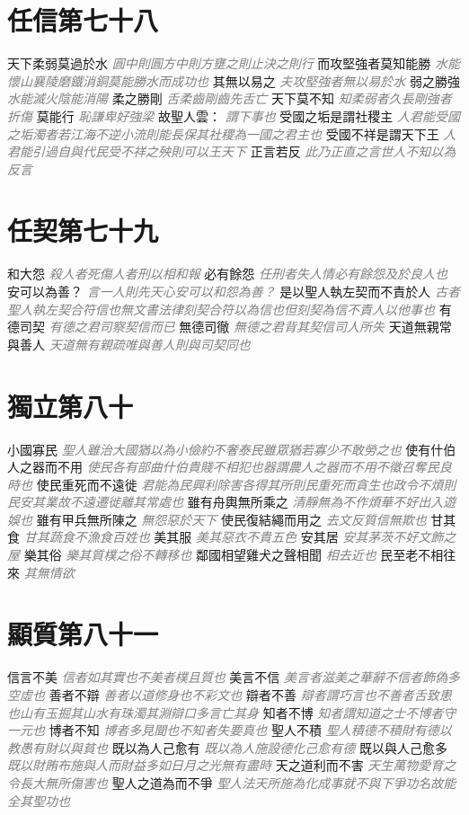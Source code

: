 \documentclass[a4paper,zihao=-4,oneside,landscape,UTF8]{ctexart}
\newcommand{\zhushi}[1]{\scriptsize{\textit{\textcolor{gray}{#1}}}\normalsize}
\begin{document}
\section{任信第七十八}

天下柔弱莫過於水
\zhushi{圓中則圓方中則方壅之則止決之則行}
而攻堅強者莫知能勝
\zhushi{水能懷山襄陵磨鐵消銅莫能勝水而成功也}
其無以易之
\zhushi{夫攻堅強者無以易於水}
弱之勝強
\zhushi{水能滅火陰能消陽}
柔之勝剛
\zhushi{舌柔齒剛齒先舌亡}
天下莫不知
\zhushi{知柔弱者久長剛強者折傷}
莫能行
\zhushi{恥謙卑好強梁}
故聖人雲：
\zhushi{謂下事也}
受國之垢是謂社稷主
\zhushi{人君能受國之垢濁者若江海不逆小流則能長保其社稷為一國之君主也}
受國不祥是謂天下王
\zhushi{人君能引過自與代民受不祥之殃則可以王天下}
正言若反
\zhushi{此乃正直之言世人不知以為反言}


\section{任契第七十九}

和大怨
\zhushi{殺人者死傷人者刑以相和報}
必有餘怨
\zhushi{任刑者失人情必有餘怨及於良人也}
安可以為善？
\zhushi{言一人則先天心安可以和怨為善？}
是以聖人執左契而不責於人
\zhushi{古者聖人執左契合符信也無文書法律刻契合符以為信也但刻契為信不責人以他事也}
有德司契
\zhushi{有德之君司察契信而已}
無德司徹
\zhushi{無德之君背其契信司人所失}
天道無親常與善人
\zhushi{天道無有親疏唯與善人則與司契同也}


\section{獨立第八十}

小國寡民
\zhushi{聖人雖治大國猶以為小儉約不奢泰民雖眾猶若寡少不敢勞之也}
使有什伯人之器而不用
\zhushi{使民各有部曲什伯貴賤不相犯也器謂農人之器而不用不徵召奪民良時也}
使民重死而不遠徙
\zhushi{君能為民興利除害各得其所則民重死而貪生也政令不煩則民安其業故不遠遷徙離其常處也}
雖有舟輿無所乘之
\zhushi{清靜無為不作煩華不好出入遊娛也}
雖有甲兵無所陳之
\zhushi{無怨惡於天下}
使民復結繩而用之
\zhushi{去文反質信無欺也}
甘其食
\zhushi{甘其蔬食不漁食百姓也}
美其服
\zhushi{美其惡衣不貴五色}
安其居
\zhushi{安其茅茨不好文飾之屋}
樂其俗
\zhushi{樂其質樸之俗不轉移也}
鄰國相望雞犬之聲相聞
\zhushi{相去近也}
民至老不相往來
\zhushi{其無情欲}


\section{顯質第八十一}

信言不美
\zhushi{信者如其實也不美者樸且質也}
美言不信
\zhushi{美言者滋美之華辭不信者飾偽多空虛也}
善者不辯
\zhushi{善者以道修身也不彩文也}
辯者不善
\zhushi{辯者謂巧言也不善者舌致患也山有玉掘其山水有珠濁其淵辯口多言亡其身}
知者不博
\zhushi{知者謂知道之士不博者守一元也}
博者不知
\zhushi{博者多見聞也不知者失要真也}
聖人不積
\zhushi{聖人積德不積財有德以教愚有財以與貧也}
既以為人己愈有
\zhushi{既以為人施設德化己愈有德}
既以與人己愈多
\zhushi{既以財賄布施與人而財益多如日月之光無有盡時}
天之道利而不害
\zhushi{天生萬物愛育之令長大無所傷害也}
聖人之道為而不爭
\zhushi{聖人法天所施為化成事就不與下爭功名故能全其聖功也}
\end{document}
